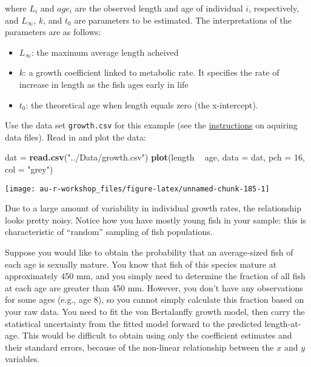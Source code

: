 \documentclass[]{book}
\newenvironment{Shaded}{\begin{snugshade}}{\end{snugshade}}
\newcommand{\KeywordTok}[1]{\textcolor[rgb]{0.13,0.29,0.53}{\textbf{#1}}}
\newcommand{\DataTypeTok}[1]{\textcolor[rgb]{0.13,0.29,0.53}{#1}}
\newcommand{\DecValTok}[1]{\textcolor[rgb]{0.00,0.00,0.81}{#1}}
\newcommand{\StringTok}[1]{\textcolor[rgb]{0.31,0.60,0.02}{#1}}
\newcommand{\OperatorTok}[1]{\textcolor[rgb]{0.81,0.36,0.00}{\textbf{#1}}}
\newcommand{\NormalTok}[1]{#1}
\providecommand{\tightlist}{%
  \setlength{\itemsep}{0pt}\setlength{\parskip}{0pt}}
\theoremstyle{definition}
\theoremstyle{definition}
\theoremstyle{definition}
\theoremstyle{remark}
\begin{document}
where \(L_i\) and \(age_i\) are the observed length and age of
individual \(i\), respectively, and \(L_{\infty}\), \(k\), and \(t_0\)
are parameters to be estimated. The interpretations of the parameters
are as follows:

\begin{itemize}
\tightlist
\item
  \(L_{\infty}\): the maximum average length acheived
\item
  \(k\): a growth coefficient linked to metabolic rate. It specifies the
  rate of increase in length as the fish ages early in life
\item
  \(t_0\): the theoretical age when length equals zero (the
  x-intercept).
\end{itemize}

Use the data set \texttt{growth.csv} for this example (see the
\protect\hyperlink{data-sets}{instructions} on aquiring data files).
Read in and plot the data:

\begin{Shaded}
\begin{Highlighting}[]
\NormalTok{dat =}\StringTok{ }\KeywordTok{read.csv}\NormalTok{(}\StringTok{"../Data/growth.csv"}\NormalTok{)}
\KeywordTok{plot}\NormalTok{(length }\OperatorTok{~}\StringTok{ }\NormalTok{age, }\DataTypeTok{data =}\NormalTok{ dat, }\DataTypeTok{pch =} \DecValTok{16}\NormalTok{, }\DataTypeTok{col =} \StringTok{"grey"}\NormalTok{)}
\end{Highlighting}
\end{Shaded}

\begin{center}\texttt{[image: au-r-workshop\_files/figure-latex/unnamed-chunk-185-1]} \end{center}

Due to a large amount of variability in individual growth rates, the
relationship looks pretty noisy. Notice how you have mostly young fish
in your sample: this is characteristic of ``random'' sampling of fish
populations.

Suppose you would like to obtain the probability that an average-sized
fish of each age is sexually mature. You know that fish of this species
mature at approximately 450 mm, and you simply need to determine the
fraction of all fish at each age are greater than 450 mm. However, you
don't have any observations for some ages (e.g., age 8), so you cannot
simply calculate this fraction based on your raw data. You need to fit
the von Bertalanffy growth model, then carry the statistical uncertainty
from the fitted model forward to the predicted length-at-age. This would
be difficult to obtain using only the coefficient estimates and their
standard errors, because of the non-linear relationship between the
\(x\) and \(y\) variables.
\end{document}
